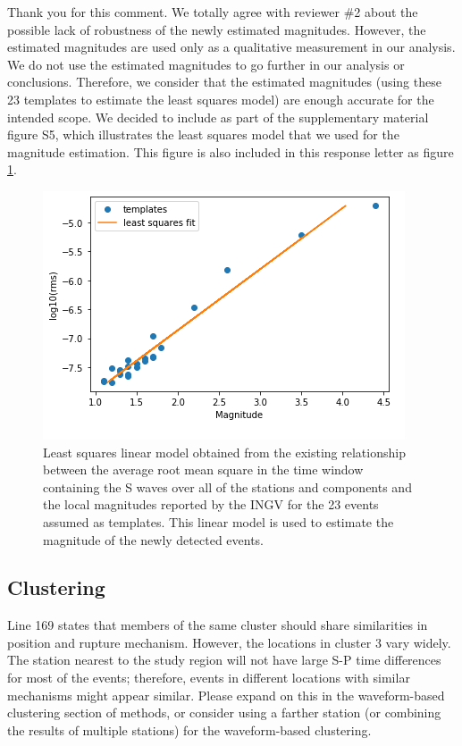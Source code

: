 \documentclass[10pt]{extarticle}
\begin{document}
\begin{Answer}
Thank you for this comment. We totally agree with reviewer \#2 about the possible lack of robustness of the newly estimated magnitudes. However, the estimated magnitudes are used only as a qualitative measurement in our analysis. We do not use the estimated magnitudes to go further in our analysis or conclusions. Therefore, we consider that the estimated magnitudes (using these 23 templates to estimate the least squares model) are enough accurate for the intended scope. We decided to include as part of the supplementary material figure S5, which illustrates the least squares model that we used for the magnitude estimation. This figure is also included in this response letter as figure \ref{fig:S5_lsq_model}.
\begin{figure}[!h]
\begin{center}
 \includegraphics[width=0.7\linewidth]{S5_lsq_model.png} 
\end{center}
\caption{Least squares linear model obtained from the existing relationship between the average root mean square in the time window containing the S waves over all of the stations and components and the local magnitudes reported by the INGV for the 23 events assumed as templates. This linear model is used to estimate the magnitude of the newly detected events.}
\label{fig:S5_lsq_model}
\end{figure}
 \WorkInProgressRevTask
\end{Answer}
%
%

\subsection*{Clustering}

\begin{ReviewerComment}{2}
\noindent 
Line 169 states that members of the same cluster should share similarities in position and rupture mechanism.  However, the locations in cluster 3 vary widely. The station nearest to the study region will not have large S-P time differences for most of the events; therefore, events in different locations with similar mechanisms might appear similar. Please expand on this in the waveform-based clustering section of methods, or consider using a farther station (or combining the results of multiple stations) for the waveform-based clustering.

\end{ReviewerComment}
\end{document}
